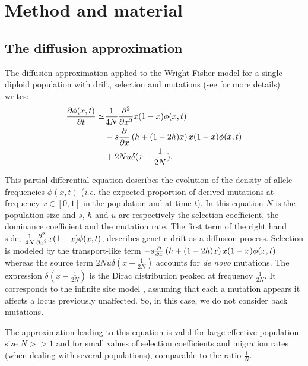 \section{Method and material}

\subsection{The diffusion approximation}
The diffusion approximation applied to the Wright-Fisher model for a single diploid population with drift, selection and mutations (see \cite{kimura1964} for more details) writes:
\begin{equation}
	\begin{split}
	\frac{\partial \phi(x,t)}{\partial t}\simeq &\frac{1}{4 N} \frac{\partial^2 }{\partial x^2} x(1-x) \phi(x,t) \\&-s \frac{\partial }{\partial x} \left(h+(1-2h)x \right)x (1-x) \phi(x,t) \\&+ 2 N u \delta(x-\frac{1}{2 N}).
	\end{split}
	\label{eq:diff}
\end{equation}

This partial differential equation describes the evolution of the density of allele frequencies $\phi(x,t)$ (\textit{i.e.} the expected proportion of derived mutations at frequency $x \in [0, 1]$ in the population and at time $t$). In this equation $N$ is the population size and $s$, $h$ and $u$ are respectively the selection coefficient, the dominance coefficient and the mutation rate.
The first term of the right hand side, $\frac{1}{4 N} \frac{\partial^2 }{\partial x^2} x(1-x) \phi(x,t)$, describes genetic drift as a diffusion process. Selection is modeled by the transport-like term $-s \frac{\partial }{\partial x} \left(h+(1-2h)x \right)x (1-x) \phi(x,t)$ whereas the source term $2 N u \delta(x-\frac{1}{2 N})$ accounts for \textit{de novo} mutations. The expression $\delta(x-\frac{1}{2 N})$ is the Dirac distribution peaked at frequency $\frac{1}{2 N}$. It corresponds to the infinite site model \cite{kimura1969}, assuming that each a mutation appears it affects a locus previously unaffected. So, in this case, we do not consider back mutations.

The approximation leading to this equation is valid for large effective population size $N >> 1$ and for small values of selection coefficients and migration rates (when dealing with several populations), comparable to the ratio $\frac{1}{N}$. 

